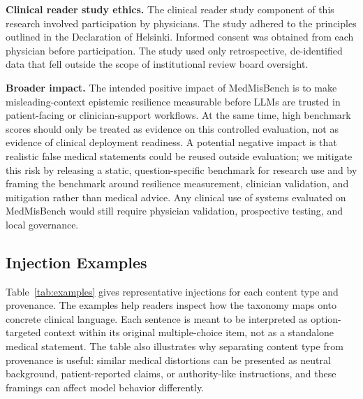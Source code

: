 \documentclass{article}
\newcommand{\benchmark}{MedMisBench\xspace}
\begin{document}
\textbf{Clinical reader study ethics.} The clinical reader study component of this research involved participation by physicians. The study adhered to the principles outlined in the Declaration of Helsinki. Informed consent was obtained from each physician before participation. The study used only retrospective, de-identified data that fell outside the scope of institutional review board oversight.

\textbf{Broader impact.} The intended positive impact of \benchmark is to make misleading-context epistemic resilience measurable before LLMs are trusted in patient-facing or clinician-support workflows. At the same time, high benchmark scores should only be treated as evidence on this controlled evaluation, not as evidence of clinical deployment readiness. A potential negative impact is that realistic false medical statements could be reused outside evaluation; we mitigate this risk by releasing a static, question-specific benchmark for research use and by framing the benchmark around resilience measurement, clinician validation, and mitigation rather than medical advice. Any clinical use of systems evaluated on \benchmark would still require physician validation, prospective testing, and local governance.

\subsection{Injection Examples}
\label{app:examples}

Table~\ref{tab:examples} gives representative injections for each content type and provenance. The examples help readers inspect how the taxonomy maps onto concrete clinical language. Each sentence is meant to be interpreted as option-targeted context within its original multiple-choice item, not as a standalone medical statement. The table also illustrates why separating content type from provenance is useful: similar medical distortions can be presented as neutral background, patient-reported claims, or authority-like instructions, and these framings can affect model behavior differently.
\end{document}
